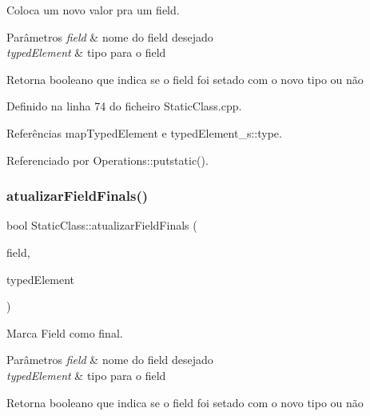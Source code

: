 Coloca um novo valor pra um field. 


\begin{DoxyParams}{Parâmetros}
{\em field} & nome do field desejado \\
\hline
{\em typed\+Element} & tipo para o field \\
\hline
\end{DoxyParams}
\begin{DoxyReturn}{Retorna}
booleano que indica se o field foi setado com o novo tipo ou não 
\end{DoxyReturn}


Definido na linha 74 do ficheiro Static\+Class.\+cpp.



Referências map\+Typed\+Element e typed\+Element\+\_\+s\+::type.



Referenciado por Operations\+::putstatic().

\mbox{\label{classStaticClass_a4e5d8d70d10266989b2821e10bd8dacc}} 
\subsubsection{\texorpdfstring{atualizar\+Field\+Finals()}{atualizarFieldFinals()}}
{\footnotesize\ttfamily bool Static\+Class\+::atualizar\+Field\+Finals (\begin{DoxyParamCaption}\item[{string}]{field,  }\item[{\hyperlink{BasicTypes_8h_a97b332303b1262282599e6ede0637b82}{Typed\+Element}}]{typed\+Element }\end{DoxyParamCaption})}



Marca Field como final. 


\begin{DoxyParams}{Parâmetros}
{\em field} & nome do field desejado \\
\hline
{\em typed\+Element} & tipo para o field \\
\hline
\end{DoxyParams}
\begin{DoxyReturn}{Retorna}
booleano que indica se o field foi setado com o novo tipo ou não 
\end{DoxyReturn}


